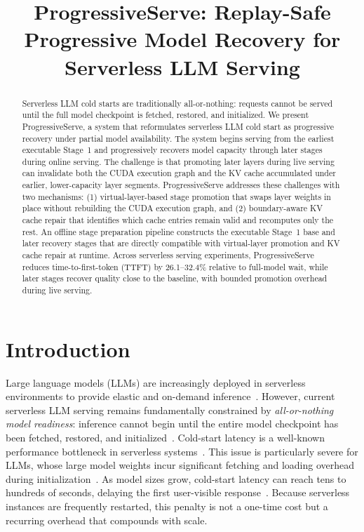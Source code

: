 \documentclass[sigplan,anonymous,review,nonacm]{acmart}
\begin{document}
\title{ProgressiveServe: Replay-Safe Progressive Model Recovery for Serverless LLM Serving}

\begin{abstract}
Serverless LLM cold starts are traditionally all-or-nothing: requests cannot be served until the full model checkpoint is fetched, restored, and initialized. We present ProgressiveServe, a system that reformulates serverless LLM cold start as progressive recovery under partial model availability. The system begins serving from the earliest executable Stage~1 and progressively recovers model capacity through later stages during online serving. The challenge is that promoting later layers during live serving can invalidate both the CUDA execution graph and the KV cache accumulated under earlier, lower-capacity layer segments. ProgressiveServe addresses these challenges with two mechanisms: (1) virtual-layer-based stage promotion that swaps layer weights in place without rebuilding the CUDA execution graph, and (2) boundary-aware KV cache repair that identifies which cache entries remain valid and recomputes only the rest. An offline stage preparation pipeline constructs the executable Stage~1 base and later recovery stages that are directly compatible with virtual-layer promotion and KV cache repair at runtime. Across serverless serving experiments, ProgressiveServe reduces time-to-first-token (TTFT) by 26.1--32.4\% relative to full-model wait, while later stages recover quality close to the baseline, with bounded promotion overhead during live serving.
\end{abstract}

\maketitle %

\section{Introduction}
Large language models (LLMs) are increasingly deployed in serverless environments to provide elastic and on-demand inference~\cite{serverlessllm, deepserve, hydraserve}. However, current serverless LLM serving remains fundamentally constrained by \emph{all-or-nothing model readiness}: inference cannot begin until the entire model checkpoint has been fetched, restored, and initialized~\cite{serverlessllm, hydraserve}. Cold-start latency is a well-known performance bottleneck in serverless systems~\cite{fork2025coldstart}. This issue is particularly severe for LLMs, whose large model weights incur significant fetching and loading overhead during initialization~\cite{serverlessllm, hydraserve, lscale}. As model sizes grow, cold-start latency can reach tens to hundreds of seconds, delaying the first user-visible response~\cite{serverlessllm, hydraserve}. Because serverless instances are frequently restarted, this penalty is not a one-time cost but a recurring overhead that compounds with scale.
\end{document}
